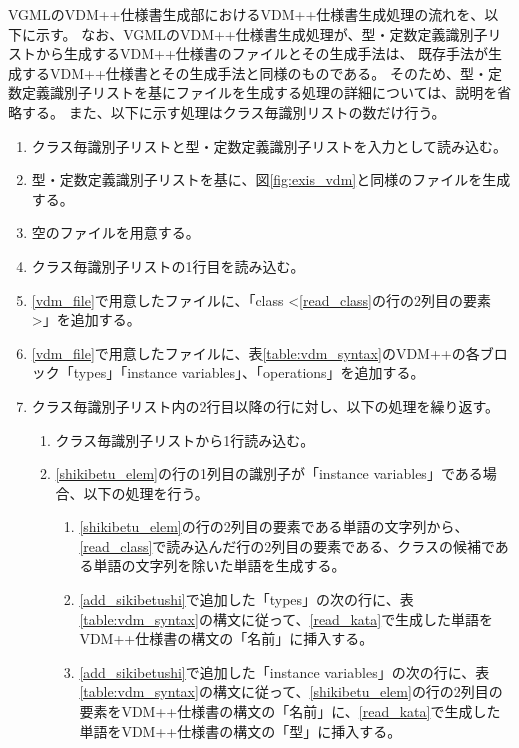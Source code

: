 VGMLのVDM++仕様書生成部におけるVDM++仕様書生成処理の流れを、以下に示す。
なお、VGMLのVDM++仕様書生成処理が、型・定数定義識別子リストから生成するVDM++仕様書のファイルとその生成手法は、
既存手法が生成するVDM++仕様書とその生成手法と同様のものである。
そのため、型・定数定義識別子リストを基にファイルを生成する処理の詳細については、説明を省略する。
また、以下に示す処理はクラス毎識別リストの数だけ行う。

\begin{enumerate}
    \item クラス毎識別子リストと型・定数定義識別子リストを入力として読み込む。
    \item 型・定数定義識別子リストを基に、図\ref{fig:exis_vdm}と同様のファイルを生成する。
    \label{katateisu_vdm}
    \item 空のファイルを用意する。
    \label{vdm_file}
    \item クラス毎識別子リストの1行目を読み込む。
    \label{read_class}
    \item \ref{vdm_file}で用意したファイルに、「class \textless \ref{read_class}の行の2列目の要素 \textgreater」を追加する。
    \item \ref{vdm_file}で用意したファイルに、表\ref{table:vdm_syntax}のVDM++の各ブロック「types」「instance variables」、「operations」を追加する。
    \label{add_sikibetushi}
    \item クラス毎識別子リスト内の2行目以降の行に対し、以下の処理を繰り返す。
        \begin{enumerate}
            \item クラス毎識別子リストから1行読み込む。
            \label{shikibetu_elem}
            \item \ref{shikibetu_elem}の行の1列目の識別子が「instance variables」である場合、以下の処理を行う。
                \begin{enumerate}
                    \item \ref{shikibetu_elem}の行の2列目の要素である単語の文字列から、\ref{read_class}で読み込んだ行の2列目の要素である、クラスの候補である単語の文字列を除いた単語を生成する。
                    \label{read_kata}
                    \item \ref{add_sikibetushi}で追加した「types」の次の行に、表{\ref{table:vdm_syntax}}の構文に従って、\ref{read_kata}で生成した単語をVDM++仕様書の構文の「名前」に挿入する。
                    \item \ref{add_sikibetushi}で追加した「instance variables」の次の行に、表\ref{table:vdm_syntax}の構文に従って、\ref{shikibetu_elem}の行の2列目の要素をVDM++仕様書の構文の「名前」に、\ref{read_kata}で生成した単語をVDM++仕様書の構文の「型」に挿入する。

\end{enumerate}
\end{enumerate}
\end{enumerate}
